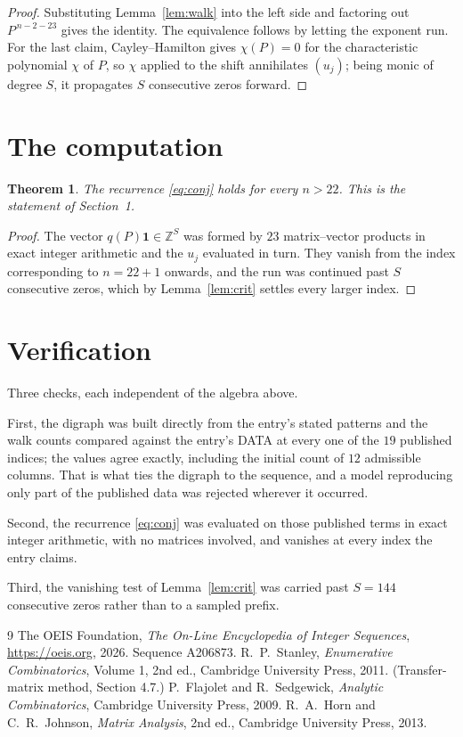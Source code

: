 \documentclass[11pt,a4paper]{article}
\theoremstyle{plain}
\newtheorem{theorem}{Theorem}
\theoremstyle{definition}
\begin{document}
\begin{proof}
Substituting Lemma~\ref{lem:walk} into the left side and factoring out
$P^{\,n-2-23}$ gives the identity. The equivalence follows by letting the exponent
run. For the last claim, Cayley--Hamilton gives $\chi(P)=0$ for the characteristic
polynomial $\chi$ of $P$, so $\chi$ applied to the shift annihilates $(u_j)$; being monic of
degree $S$, it propagates $S$ consecutive zeros forward.
\end{proof}

\section{The computation}

\begin{theorem}
The recurrence \eqref{eq:conj} holds for every $n>22$. This is the statement of
Section~1.
\end{theorem}

\begin{proof}
The vector $q(P)\mathbf{1}\in\mathbb{Z}^{S}$ was formed by $23$ matrix--vector
products in exact integer arithmetic and the $u_j$ evaluated in turn. They vanish from the
index corresponding to $n=22+1$ onwards, and the run was continued past $S$ consecutive
zeros, which by Lemma~\ref{lem:crit} settles every larger index.
\end{proof}

\section{Verification}

Three checks, each independent of the algebra above.

First, the digraph was built directly from the entry's stated patterns and the walk counts
compared against the entry's DATA at every one of the $19$ published indices; the
values agree exactly, including the initial count of $12$ admissible columns. That is
what ties the digraph to the sequence, and a model reproducing only part of the published
data was rejected wherever it occurred.

Second, the recurrence \eqref{eq:conj} was evaluated on those published terms in exact
integer arithmetic, with no matrices involved, and vanishes at every index the entry claims.

Third, the vanishing test of Lemma~\ref{lem:crit} was carried past $S=144$ consecutive
zeros rather than to a sampled prefix.

\begin{thebibliography}{9}
 The OEIS Foundation, \emph{The On-Line Encyclopedia of Integer
Sequences}, \url{https://oeis.org}, 2026. Sequence A206873.
 R.~P.~Stanley, \emph{Enumerative Combinatorics}, Volume 1, 2nd ed.,
Cambridge University Press, 2011. (Transfer-matrix method, Section 4.7.)
 P.~Flajolet and R.~Sedgewick, \emph{Analytic Combinatorics}, Cambridge
University Press, 2009.
 R.~A.~Horn and C.~R.~Johnson, \emph{Matrix Analysis}, 2nd ed., Cambridge
University Press, 2013.
\end{thebibliography}
\end{document}
